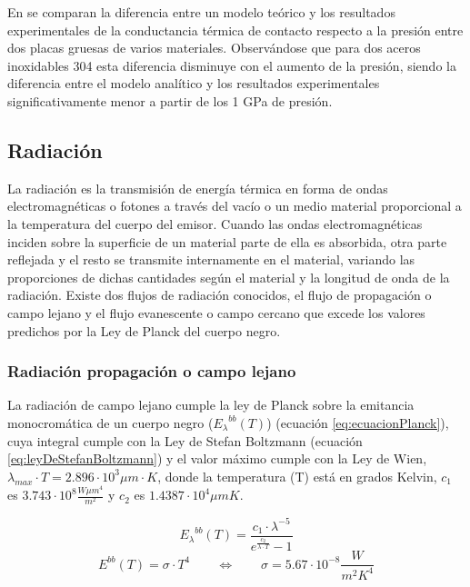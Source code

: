 En \cite{experimental_Rc_SS} se comparan la diferencia entre un modelo teórico y los resultados experimentales de la conductancia térmica de contacto respecto a la presión entre dos placas gruesas de varios materiales. Observándose que para dos aceros inoxidables 304 esta diferencia disminuye con el aumento de la presión, siendo la diferencia entre el modelo analítico y los resultados experimentales significativamente menor a partir de los 1 GPa de presión.

\subsection{Radiación}
La radiación es la transmisión de energía térmica en forma de ondas electromagnéticas o fotones a través del vacío o un medio material proporcional a la temperatura del cuerpo del emisor. Cuando las ondas electromagnéticas inciden sobre la superficie de un material parte de ella es absorbida, otra parte reflejada y el resto se transmite internamente en el material, variando las proporciones de dichas cantidades según el material y la longitud de onda de la radiación. Existe dos flujos de radiación conocidos, el flujo de propagación o campo lejano y el flujo evanescente o campo cercano que excede los valores predichos por la Ley de Planck del cuerpo negro.\\

\subsubsection{Radiación propagación o campo lejano}
La radiación de campo lejano cumple la ley de Planck sobre la emitancia monocromática de un cuerpo negro (${E_{\lambda}}^{bb}(T)$) (ecuación \ref{eq:ecuacionPlanck}), cuya integral cumple con la Ley de Stefan Boltzmann (ecuación \ref{eq:leyDeStefanBoltzmann}) y el valor máximo cumple con la Ley de Wien, $\lambda_{max}\cdot T=2.896\cdot 10^3 \mu m\cdot K$, donde la temperatura (T) está en grados Kelvin, $c_1$ es $3.743\cdot 10^8 \frac{W\mu m^4}{m^2}$ y $c_2$ es $1.4387\cdot 10^4 \mu mK$.

\begin{equation}
{E_\lambda}^{bb}\left( T \right) = \dfrac{c_1\cdot \lambda^{-5}}{e^{\frac{c_2}{\lambda \cdot T}}-1}
\label{eq:ecuacionPlanck}
\end{equation}
\begin{equation}
{E}^{bb}\left( T \right)=\sigma \cdot T^4 \qquad \Longleftrightarrow \qquad \sigma = 5.67\cdot 10^{-8} \dfrac{W}{m^2 K^4}
\label{eq:leyDeStefanBoltzmann}
\end{equation}

